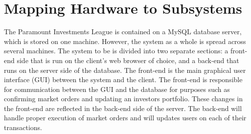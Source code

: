 \section{Mapping Hardware to Subsystems}

The Paramount Investments League is contained on a MySQL
database server, which is stored on one machine. However,
the system as a whole is spread across several machines. The
system to be is divided into two separate sections: a front-end
side that is run on the client’s web browser of choice, and a
back-end that runs on the server side of the database. The front-end
is the main graphical user interface (GUI) between the system and
the client. The front-end is responsible for communication between
the GUI and the database for purposes such as confirming market
orders and updating an investors portfolio. These changes in the
front-end are reflected in the back-end side of the server. The
back-end will handle proper execution of market orders and will
updates users on each of their transactions.


